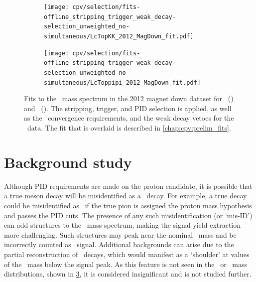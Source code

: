 \begin{figure}
  \begin{subfigure}[b]{0.5\textwidth}
    \texttt{[image: cpv/selection/fits-offline\_stripping\_trigger\_weak\_decay-selection\_unweighted\_no-simultaneous/LcTopKK\_2012\_MagDown\_fit.pdf]}
    \caption{\pKK}
    \label{fig:cpv:selection:postpid:pKK}
  \end{subfigure}
  \begin{subfigure}[b]{0.5\textwidth}
    \texttt{[image: cpv/selection/fits-offline\_stripping\_trigger\_weak\_decay-selection\_unweighted\_no-simultaneous/LcToppipi\_2012\_MagDown\_fit.pdf]}
    \caption{\ppipi}
    \label{fig:cpv:selection:postpid:ppipi}
  \end{subfigure}
  \caption{%
    Fits to the \PLambdac\ mass spectrum in the 2012 magnet down dataset for 
    \pKK\ () and \ppipi\ 
    ().
    The stripping, trigger, and \ac{PID} selection is applied, as well as the 
    \decaytreefitter\ convergence requirements, and the weak decay vetoes for 
    the \ppipi\ data.
    The fit that is overlaid is described in \cref{chap:cpv:prelim_fits}.
  }
  \label{fig:cpv:selection:postpid}
\end{figure}

\section{Background study}
\label{chap:cpv:selection:background_study}

Although \ac{PID} requirements are made on the proton candidate, it is possible 
that a true meson decay will be misidentified as a \PLambdac\ decay.
For example, a true \decay{\PDsplus}{\PKminus\PKplus\Ppiplus} decay could be 
misidentified as \LcTopKK\ if the true pion is assigned the proton mass 
hypothesis and passes the \ac{PID} cuts.
The presence of any such misidentification (or `mis-ID') can add structures to 
the \PLambdac\ mass spectrum, making the signal yield extraction more 
challenging.
Such structures may peak near the nominal \PLambdac\ mass and be incorrectly 
counted as \PLambdac\ signal.
Additional backgrounds can arise due to the partial reconstruction of 
\PLambdac\ decays, which would manifest as a `shoulder' at values of the 
\PLambdac\ mass below the signal peak.
As this feature is not seen in the \pKK\ or \ppipi\ mass distributions, shown 
in \cref{fig:cpv:selection:postpid}, it is considered insignificant and is not 
studied further.

